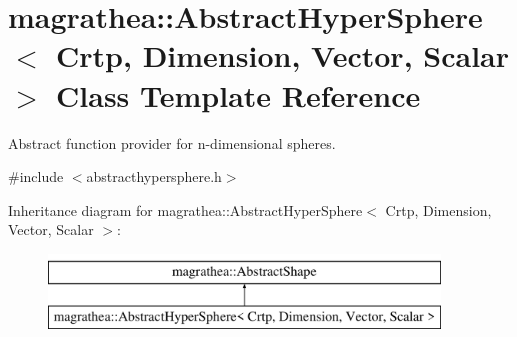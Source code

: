 \hypertarget{classmagrathea_1_1AbstractHyperSphere}{\section{magrathea\-:\-:Abstract\-Hyper\-Sphere$<$ Crtp, Dimension, Vector, Scalar $>$ Class Template Reference}
\label{classmagrathea_1_1AbstractHyperSphere}
}


Abstract function provider for n-\/dimensional spheres.  




{\ttfamily \#include $<$abstracthypersphere.\-h$>$}

Inheritance diagram for magrathea\-:\-:Abstract\-Hyper\-Sphere$<$ Crtp, Dimension, Vector, Scalar $>$\-:\begin{figure}[H]
\begin{center}
\leavevmode
\includegraphics[height=2.000000cm]{classmagrathea_1_1AbstractHyperSphere}
\end{center}
\end{figure}
